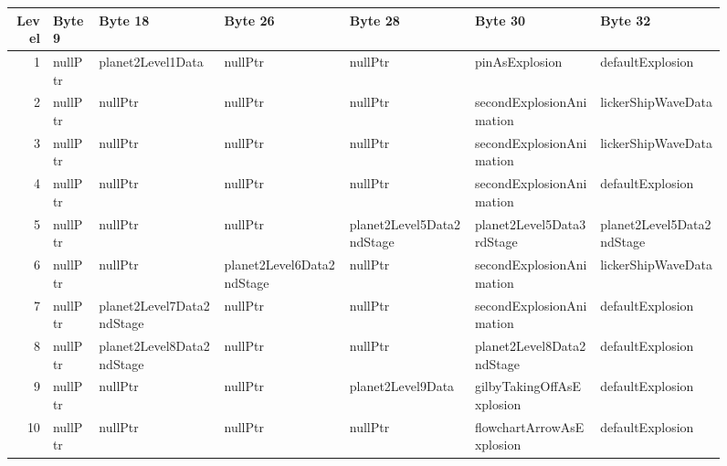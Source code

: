 \begin{figure}[H]
  {
    \setlength{\tabcolsep}{3.0pt}
    \setlength\cmidrulewidth{\heavyrulewidth} %
    \begin{adjustbox}{width=\textwidth}

      \begin{tabular}{rllllll}
        \toprule
        Level & Byte 9           & Byte 18                    & Byte 26                   & Byte 28                   & Byte 30                    & Byte 32                    \\
        \midrule
        1 & nullPtr          & planet2Level1Data          & nullPtr                   & nullPtr                   & pinAsExplosion             & defaultExplosion           \\
        2 & nullPtr          & nullPtr                    & nullPtr                   & nullPtr                   & secondExplosionAnimation   & lickerShipWaveData         \\
        3 & nullPtr          & nullPtr                    & nullPtr                   & nullPtr                   & secondExplosionAnimation   & lickerShipWaveData         \\
        4 & nullPtr          & nullPtr                    & nullPtr                   & nullPtr                   & secondExplosionAnimation   & defaultExplosion           \\
        5 & nullPtr          & nullPtr                    & nullPtr                   & planet2Level5Data2ndStage & planet2Level5Data3rdStage  & planet2Level5Data2ndStage  \\
        6 & nullPtr          & nullPtr                    & planet2Level6Data2ndStage & nullPtr                   & secondExplosionAnimation   & lickerShipWaveData         \\
        7 & nullPtr          & planet2Level7Data2ndStage  & nullPtr                   & nullPtr                   & secondExplosionAnimation   & defaultExplosion           \\
        8 & nullPtr          & planet2Level8Data2ndStage  & nullPtr                   & nullPtr                   & planet2Level8Data2ndStage  & defaultExplosion           \\
        9 & nullPtr          & nullPtr                    & nullPtr                   & planet2Level9Data         & gilbyTakingOffAsExplosion  & defaultExplosion           \\
        10 & nullPtr          & nullPtr                    & nullPtr                   & nullPtr                   & flowchartArrowAsExplosion  & defaultExplosion           \\

\end{tabular}
\end{adjustbox}}
\end{figure}
